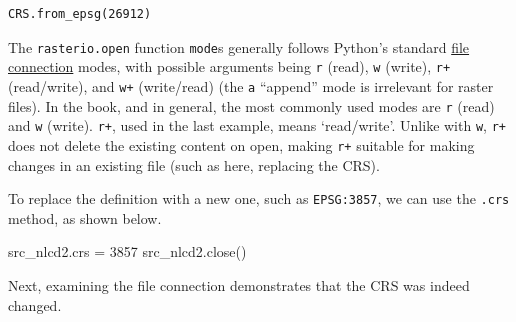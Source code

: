 \documentclass[
  letterpaper,
]{krantz}
\newenvironment{Shaded}{\begin{snugshade}}{\end{snugshade}}
\newcommand{\DecValTok}[1]{\textcolor[rgb]{0.68,0.00,0.00}{#1}}
\newcommand{\NormalTok}[1]{\textcolor[rgb]{0.00,0.23,0.31}{#1}}
\newcommand{\OperatorTok}[1]{\textcolor[rgb]{0.37,0.37,0.37}{#1}}
\begin{document}
\begin{verbatim}
CRS.from_epsg(26912)
\end{verbatim}

\begin{tcolorbox}[enhanced jigsaw, title=\textcolor{quarto-callout-note-color}{\faInfo}\hspace{0.5em}{Note}, arc=.35mm, toprule=.15mm, titlerule=0mm, colframe=quarto-callout-note-color-frame, breakable, toptitle=1mm, bottomtitle=1mm, rightrule=.15mm, colbacktitle=quarto-callout-note-color!10!white, leftrule=.75mm, left=2mm, bottomrule=.15mm, opacityback=0, coltitle=black, opacitybacktitle=0.6, colback=white]

The \texttt{rasterio.open} function \texttt{mode}s generally follows
Python's standard
\href{https://docs.python.org/3/tutorial/inputoutput.html\#reading-and-writing-files}{file
connection} modes, with possible arguments being
\texttt{\textquotesingle{}r\textquotesingle{}} (read),
\texttt{\textquotesingle{}w\textquotesingle{}} (write),
\texttt{\textquotesingle{}r+\textquotesingle{}} (read/write), and
\texttt{\textquotesingle{}w+\textquotesingle{}} (write/read) (the
\texttt{\textquotesingle{}a\textquotesingle{}} ``append'' mode is
irrelevant for raster files). In the book, and in general, the most
commonly used modes are \texttt{\textquotesingle{}r\textquotesingle{}}
(read) and \texttt{\textquotesingle{}w\textquotesingle{}} (write).
\texttt{\textquotesingle{}r+\textquotesingle{}}, used in the last
example, means `read/write'. Unlike with
\texttt{\textquotesingle{}w\textquotesingle{}},
\texttt{\textquotesingle{}r+\textquotesingle{}} does not delete the
existing content on open, making
\texttt{\textquotesingle{}r+\textquotesingle{}} suitable for making
changes in an existing file (such as here, replacing the CRS).

\end{tcolorbox}

To replace the definition with a new one, such as \texttt{EPSG:3857}, we
can use the \texttt{.crs} method, as shown below.

\begin{Shaded}
\begin{Highlighting}[]
\NormalTok{src\_nlcd2.crs }\OperatorTok{=} \DecValTok{3857}
\NormalTok{src\_nlcd2.close()}
\end{Highlighting}
\end{Shaded}

Next, examining the file connection demonstrates that the CRS was indeed
changed.
\end{document}
